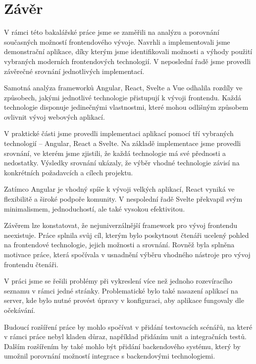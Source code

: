 \section*{Závěr}

\begin{zvyraznenyodstavec}
V rámci této bakalářské práce jsme se zaměřili na analýzu a porovnání současných možností frontendového vývoje. 
Navrhli a implementovali jsme demonstrační aplikace, díky kterým jsme identifikovali možnosti a výhody použití vybraných moderních frontendových technologií. 
V neposlední řadě jsme provedli závěrečné srovnání jednotlivých implementací.

Samotná analýza frameworků Angular, React, Svelte a Vue odhalila rozdíly ve způsobech, jakými jednotlivé technologie přistupují k vývoji frontendu. 
Každá technologie disponuje jedinečnými vlastnostmi, které mohou odlišným způsobem ovlivnit vývoj webových aplikací. 

V praktické části jsme provedli implementaci aplikací pomocí tří vybraných technologií -- Angular, React a Svelte. 
Na základě implementace jsme provedli srovnání, ve kterém jsme zjistili, že každá technologie má své přednosti a nedostatky. 
Výsledky srovnání ukázaly, že výběr vhodné technologie závisí na konkrétních požadavcích a cílech projektu.

Zatímco Angular je vhodný spíše k vývoji velkých aplikací, React vyniká ve flexibilitě a široké podpoře komunity. 
V nespolední řadě Svelte překvapil svým minimalismem, jednoduchostí, ale také vysokou efektivitou.

Závěrem lze konstatovat, že nejuniverzálnější framework pro vývoj frontendu neexistuje. 
Práce splnila svůj cíl, kterým bylo poskytnout čtenáři ucelený pohled na frontendové technologie, jejich možnosti a srovnání.
Rovněž byla splněna motivace práce, která spočívala v usnadnění výběru vhodného nástroje pro vývoj frontendu čtenáři.

V práci jsme se řešili problémy při vykreslení více než jednoho rozevíracího seznamu v rámci jedné stránky. 
Problematické bylo také nasazení aplikací na server, kde bylo nutné provést úpravy v konfiguraci, aby aplikace fungovaly dle očekávání.

Budoucí rozšíření práce by mohlo spočívat v přidání testovacích scénářů, na které v rámci práce nebyl kladen důraz, například přidáním unit a integračních testů.
Dalším rozšířením by také mohlo být přidání backendového systému, který by umožnil porovnání možností integrace s backendovými technologiemi.
\end{zvyraznenyodstavec}


